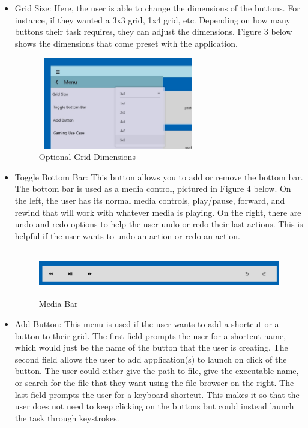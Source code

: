 \documentclass[fullpage, 10pt, onecolumn, draftclsnofoot]{IEEEtran}
\begin{document}
\begin{itemize}
    \item Grid Size: Here, the user is able to change the dimensions of the buttons. For instance, if they wanted a 3x3 grid, 1x4 grid, etc. Depending on how many buttons their task requires, they can adjust the dimensions. Figure 3 below shows the dimensions that come preset with the application.  
    \begin{figure}[H]
        \centering
        \includegraphics[width=7cm, height=4cm]{images/grid.jpg}
        \caption{Optional Grid Dimensions}
        \label{fig:my_label}
    \end{figure}
    \item Toggle Bottom Bar: This button allows you to add or remove the bottom bar. The bottom bar is used as a media control, pictured in Figure 4 below. On the left, the user has its normal media controls, play/pause, forward, and rewind that will work with whatever media is playing. On the right, there are undo and redo options to help the user undo or redo their last actions. This is helpful if the user wants to undo an action or redo an action. 
    \begin{figure}[H]
        \centering
        \includegraphics[width=14cm, height=2cm]{images/BottomBar.jpg}
        \caption{Media Bar}
        \label{fig:my_label}
    \end{figure}
    \item Add Button: This menu is used if the user wants to add a shortcut or a button to their grid. The first field prompts the user for a shortcut name, which would just be the name of the button that the user is creating. The second field allows the user to add application(s) to launch on click of the button. The user could either give the path to file, give the executable name, or search for the file that they want using the file browser on the right. The last field prompts the user for a keyboard shortcut. This makes it so that the user does not need to keep clicking on the buttons but could instead launch the task through keystrokes. 

\end{itemize}
\end{document}
